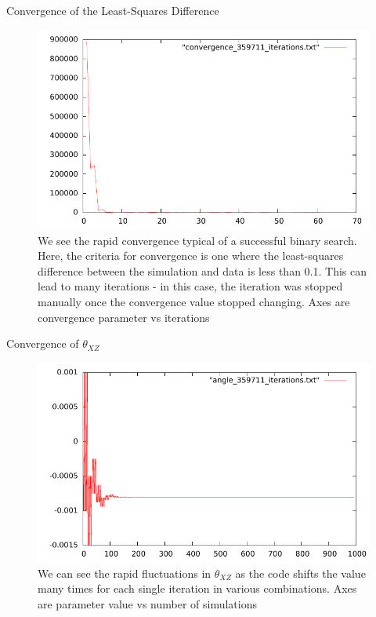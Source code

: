 \begin{frame}{Convergence of the Least-Squares Difference }
\begin{figure}
\begin{center}
\includegraphics[width=0.8\linewidth]{../RootFinding/figs/convergence_359711_iterations.pdf}
\end{center}
\caption{We see the rapid convergence typical of a successful binary search.
Here, the criteria for convergence is one where the least-squares difference
between the simulation and data is less than 0.1. This can lead to many
iterations - in this case, the iteration was stopped manually once the
convergence value stopped changing. Axes are convergence parameter vs iterations}
\label{fig:convergence_359711_iterations}
\end{figure}
\end{frame}

\begin{frame}{Convergence of $\theta_{XZ}$ }
\begin{figure}
\begin{center}
\includegraphics[width=0.8\linewidth]{../RootFinding/figs/angle_359711_convergence.pdf}
\end{center}
\caption{We can see the rapid fluctuations in $\theta_{XZ}$ as the code shifts
the value many times for each single iteration in various combinations. Axes are
parameter value vs number of simulations}
\label{fig:angle_359711_convergence}
\end{figure}
\end{frame}


